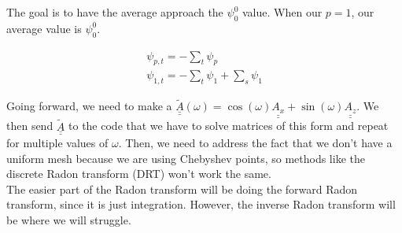 \documentclass[12pt]{article}
\newcommand{\bunderline}[1]{\underline{#1}}
\newcommand{\mat}[1]{{\bunderline{\bunderline{#1}}}}
\begin{document}
The goal is to have the average approach the $\psi_0^0$ value. When our $p = 1$, our average value is $\psi_0^0$. 

\begin{align*}
\psi_{p,t} = -\sum_t \psi_p \\
\psi_{1,t} = -\sum_t \psi_1 + \sum_s \psi_1
\end{align*}

Going forward, we need to make a $\widetilde{\mat{A}} (\omega) = \cos(\omega) \mat{A_x} + \sin(\omega) \mat{A_z}$. We then send $\widetilde{\mat{A}}$ to the code that we have to solve matrices of this form and repeat for multiple values of $\omega$. Then, we need to address the fact that we don't have a uniform mesh because we are using Chebyshev points, so methods like the discrete Radon transform (DRT) won't work the same. \\
The easier part of the Radon transform will be doing the forward Radon transform, since it is just integration. However, the inverse Radon transform will be where we will struggle. 
\end{document}
